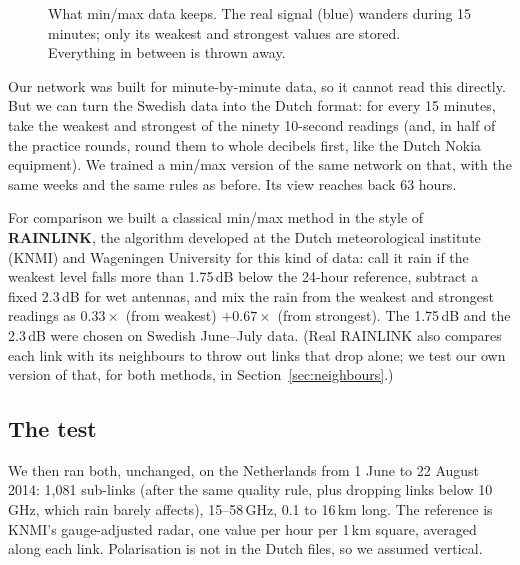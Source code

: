 \begin{figure}[h]
\centering
{}
\caption{What min/max data keeps. The real signal (blue) wanders during 15 minutes; only its weakest and strongest
values are stored. Everything in between is thrown away.}
\label{fig:minmax}
\end{figure}

Our network was built for minute-by-minute data, so it cannot read this directly. But we can turn the Swedish data into
the Dutch format: for every 15 minutes, take the weakest and strongest of the ninety 10-second readings (and, in half of
the practice rounds, round them to whole decibels first, like the Dutch Nokia equipment). We trained a min/max version of
the same network on that, with the same weeks and the same rules as before. Its view reaches back 63 hours.

For comparison we built a classical min/max method in the style of \textbf{RAINLINK}, the algorithm developed at the Dutch
meteorological institute (KNMI) and Wageningen University for this kind of data: call it rain if the weakest level falls more than 1.75\,dB below the
24-hour reference, subtract a fixed 2.3\,dB for wet antennas, and mix the rain from the weakest and strongest readings
as $0.33\times$ (from weakest) $+ 0.67\times$ (from strongest). The 1.75\,dB and the 2.3\,dB were chosen on Swedish June--July
data. (Real RAINLINK also compares each link with its neighbours to throw out links that drop alone; we test our own
version of that, for both methods, in Section~\ref{sec:neighbours}.)

\subsection{The test}
We then ran both, unchanged, on the Netherlands from 1 June to 22 August 2014: 1{,}081 sub-links (after the same quality
rule, plus dropping links below 10\,GHz, which rain barely affects), 15--58\,GHz, 0.1 to 16\,km long. The reference is
KNMI's gauge-adjusted radar, one value per hour per 1\,km square, averaged along each link. Polarisation is not in the
Dutch files, so we assumed vertical.


